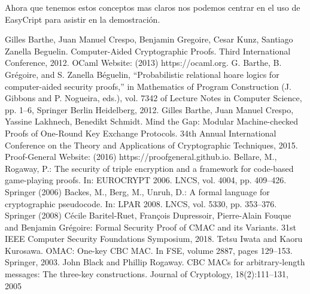 \documentclass[runningheads]{llncs}
\begin{document}
Ahora que tenemos estos conceptos mas claros nos podemos centrar en el uso de EasyCript para asistir en la demostración.




\begin{thebibliography}{8}
Gilles Barthe, Juan Manuel Crespo, Benjamin Gregoire, Cesar Kunz, Santiago Zanella Beguelin. Computer-Aided Cryptographic Proofs. Third International Conference, 2012.
OCaml Website: (2013) https://ocaml.org.
G. Barthe, B. Grégoire, and S. Zanella Béguelin, “Probabilistic relational hoare
logics for computer-aided security proofs,” in Mathematics of Program Construction
(J. Gibbons and P. Nogueira, eds.), vol. 7342 of Lecture Notes in
Computer Science, pp. 1–6, Springer Berlin Heidelberg, 2012.
Gilles Barthe, Juan Manuel Crespo, Yassine Lakhnech, Benedikt Schmidt. Mind the Gap: Modular Machine-checked Proofs of One-Round Key Exchange Protocols. 34th Annual International Conference on the Theory and Applications of Cryptographic Techniques, 2015.
Proof-General Website: (2016) https://proofgeneral.github.io.
Bellare, M., Rogaway, P.: The security of triple encryption and a framework for
code-based game-playing proofs. In: EUROCRYPT 2006. LNCS, vol. 4004, pp.
409–426. Springer (2006)
Backes, M., Berg, M., Unruh, D.: A formal language for cryptographic pseudocode.
In: LPAR 2008. LNCS, vol. 5330, pp. 353–376. Springer (2008)
Cécile Baritel-Ruet, François Dupressoir, Pierre-Alain Fouque and Benjamin Grégoire: Formal Security Proof of CMAC and its Variants.
31st IEEE Computer Security Foundations Symposium, 2018.
Tetsu Iwata and Kaoru Kurosawa. OMAC: One-key CBC MAC. In FSE, volume 2887, pages 129–153. Springer, 2003.
John Black and Phillip Rogaway. CBC MACs for arbitrary-length messages: The three-key constructions. Journal of Cryptology, 18(2):111–131, 2005
\end{thebibliography}
\end{document}
